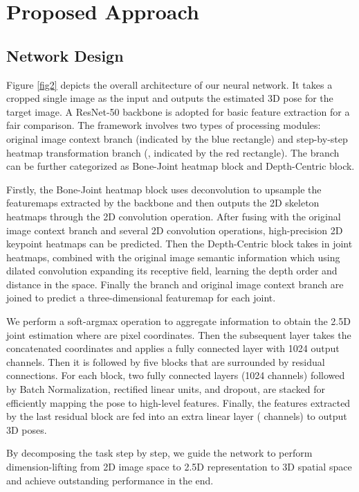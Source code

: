 \documentclass[letterpaper]{article} \usepackage{aaai21}  \usepackage{times}  \usepackage{helvet} \usepackage{courier}  \usepackage[hyphens]{url}  \usepackage{graphicx} \urlstyle{rm} \def\UrlFont{\rm}  \usepackage{natbib}  \usepackage{caption} \frenchspacing  \setlength{\pdfpagewidth}{8.5in}  \setlength{\pdfpageheight}{11in}
\begin{document}
\section{Proposed Approach}



\subsection{Network Design}
\label{sec1}
Figure \ref{fig2} depicts the overall architecture of our neural network. It takes a cropped single image as the input and outputs the estimated 3D pose for the target image. A ResNet-50 \cite{he2016deep} backbone is adopted for basic feature extraction for a fair comparison. The framework involves two types of processing modules: original image context branch (indicated by the blue rectangle) and step-by-step heatmap transformation branch (, indicated by the red rectangle). The  branch can be further categorized as Bone-Joint heatmap block and Depth-Centric block. 

Firstly, the Bone-Joint heatmap block uses deconvolution to upsample the featuremaps extracted by the backbone and then outputs the 2D skeleton heatmaps through the 2D convolution operation. After fusing with the original image context branch and several 2D convolution operations, high-precision 2D keypoint heatmaps can be predicted. Then the Depth-Centric block takes in joint heatmaps, combined with the original image semantic information which using dilated convolution expanding its receptive field, learning the depth order and distance in the space. Finally the  branch and original image context branch are joined to predict a three-dimensional featuremap for each joint. 

We perform a soft-argmax operation \cite{sun2018integral} to aggregate information to obtain the 2.5D joint estimation where  are pixel coordinates. Then the subsequent layer takes the concatenated coordinates and applies a fully connected layer with 1024 output channels. Then it is followed by five blocks that are surrounded by residual connections. For each block, two fully connected layers (1024 channels) followed by Batch Normalization, rectified linear units, and dropout, are stacked for efficiently mapping the pose to high-level features. Finally, the features extracted by the last residual block are fed into an extra linear layer ( channels) to output 3D poses. 

By decomposing the task step by step, we guide the network to perform dimension-lifting from 2D image space to 2.5D representation to 3D spatial space and achieve outstanding performance in the end.
\end{document}
